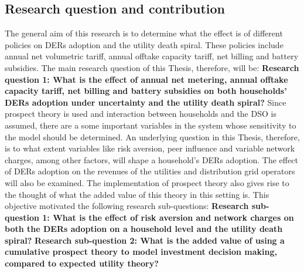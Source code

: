 \subsection{Research question and contribution}
The general aim of this research is to determine what the effect is of different policies on DERs adoption and the utility death spiral. These policies include annual net volumetric tariff, annual offtake capacity tariff, net billing and battery subsidies. The main research question of this Thesis, therefore, will be:
\newline\newline
\textbf{Research question 1: What is the effect of annual net metering, annual offtake capacity tariff, net billing and battery subsidies on both households' DERs adoption under uncertainty and the utility death spiral?}
\newline\newline
Since prospect theory is used and interaction between households and the DSO is assumed, there are a some important variables in the system whose sensitivity to the model should be determined. An underlying question in this Thesis, therefore, is to what extent variables like risk aversion, peer influence and variable network charges, among other factors, will shape a household's DERs adoption. The effect of DERs adoption on the revenues of the utilities and distribution grid operators will also be examined. The implementation of prospect theory also gives rise to the thought of what the added value of this theory in this setting is. This objective motivated the following research sub-questions:
\newline\newline
\textbf{Research sub-question 1: What is the effect of risk aversion and network charges on both the DERs adoption on a household level and the utility death spiral?}
\newline \newline
\textbf{Research sub-question 2: What is the added value of using a cumulative prospect theory to model investment decision making, compared to expected utility theory?}
\newline \newline \noindent
